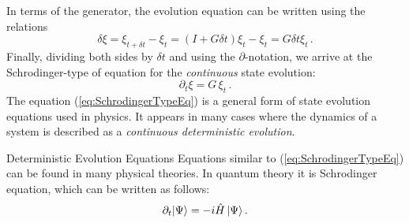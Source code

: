 In terms of the generator, the evolution equation can be written using the relations 
\[
\delta \xi = \xi_{t+\delta t} - \xi_t = \left(I + G\delta t\right)\xi_t - \xi_t = G\delta t\xi_t\,.
\]
Finally, dividing both sides by $\delta t$ and using the $\partial$-notation, we arrive at the Schrodinger-type of equation for the \emph{continuous} state evolution:
\begin{equation}
	\partial_t \xi = G\,\xi_t\,.
	\label{eq:SchrodingerTypeEq}
\end{equation}
The equation (\ref{eq:SchrodingerTypeEq}) is a general form of state evolution equations used in physics. It appears in many cases where the dynamics of a system is described as a \emph{continuous deterministic evolution}. 
\begin{mybio}{Deterministic Evolution Equations}
	Equations similar to (\ref{eq:SchrodingerTypeEq}) can be found in many physical theories. In quantum theory it is Schrodinger equation, which can be written as follows:
	\[
	\partial_t|{\Psi}\rangle = -i\hat{H}\,|{\Psi}\rangle\,.
	\]
\end{mybio}

